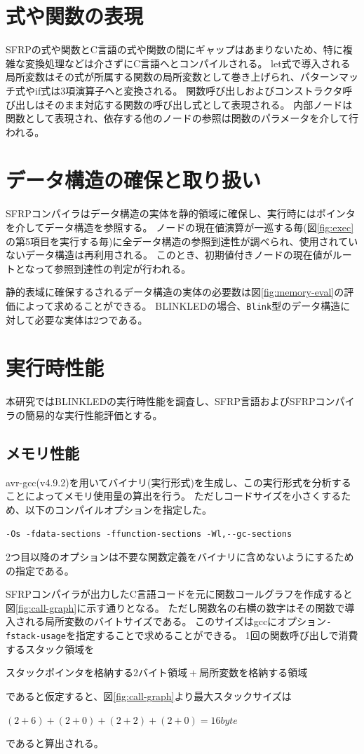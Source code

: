 \section{式や関数の表現}
SFRPの式や関数とC言語の式や関数の間にギャップはあまりないため、特に複雑な変換処理などは介さずにC言語へとコンパイルされる。
let式で導入される局所変数はその式が所属する関数の局所変数として巻き上げられ、パターンマッチ式やif式は3項演算子へと変換される。
関数呼び出しおよびコンストラクタ呼び出しはそのまま対応する関数の呼び出し式として表現される。
内部ノードは関数として表現され、依存する他のノードの参照は関数のパラメータを介して行われる。

\section{データ構造の確保と取り扱い}
SFRPコンパイラはデータ構造の実体を静的領域に確保し、実行時にはポインタを介してデータ構造を参照する。
ノードの現在値演算が一巡する毎(図\ref{fig:exec}の第5項目を実行する毎)に全データ構造の参照到達性が調べられ、使用されていないデータ構造は再利用される。
このとき、初期値付きノードの現在値がルートとなって参照到達性の判定が行われる。

静的表域に確保するされるデータ構造の実体の必要数は図\ref{fig:memory-eval}の評価によって求めることができる。
BLINKLEDの場合、\texttt{Blink}型のデータ構造に対して必要な実体は2つである。


\section{実行時性能}
本研究ではBLINKLEDの実行時性能を調査し、SFRP言語およびSFRPコンパイラの簡易的な実行性能評価とする。

\subsection{メモリ性能}
avr-gcc(v4.9.2)を用いてバイナリ(実行形式)を生成し、この実行形式を分析することによってメモリ使用量の算出を行う。
ただしコードサイズを小さくするため、以下のコンパイルオプションを指定した。
\begin{lstlisting}[basicstyle=\ttfamily\small,numbers=none,frame=none]
-Os -fdata-sections -ffunction-sections -Wl,--gc-sections
\end{lstlisting}
2つ目以降のオプションは不要な関数定義をバイナリに含めないようにするための指定である。

SFRPコンパイラが出力したC言語コードを元に関数コールグラフを作成すると図\ref{fig:call-graph}に示す通りとなる。
ただし関数名の右横の数字はその関数で導入される局所変数のバイトサイズである。
このサイズはgccにオプション\texttt{-fstack-usage}を指定することで求めることができる。
1回の関数呼び出しで消費するスタック領域を
\begin{center}
$スタックポインタを格納する2バイト領域 + 局所変数を格納する領域$
\end{center}
であると仮定すると、図\ref{fig:call-graph}より最大スタックサイズは
\begin{center}
$ (2 + 6) + (2 + 0) + (2 + 2) + (2 + 0) = 16 byte$\\
\end{center}
であると算出される。

